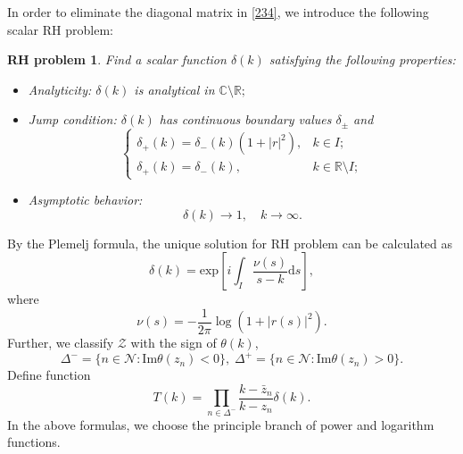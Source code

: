 \documentclass[11pt]{article}
\numberwithin{equation}{section}
\newtheorem{RHP}{RH problem}
\begin{document}
In order to eliminate the diagonal matrix in \eqref{234}, we introduce the following scalar RH problem:
\begin{RHP}\label{rhp2}
    Find a scalar function $\delta(k)$ satisfying the following properties:
\begin{itemize}
  \item Analyticity: $\delta(k)$ is analytical in $\mathbb{C}\setminus\mathbb{R};$
  \item Jump condition: $\delta(k)$ has continuous boundary values $\delta_{\pm}$ and
      \begin{equation*}
\left\{\begin{array}{ll}
\delta_+(k)=\delta_-(k)(1+|r|^2), &k\in I;\\
\delta_+(k)=\delta_-(k), &k\in\mathbb{R}\setminus I;\end{array}\right.
\end{equation*}
  \item Asymptotic behavior:
  \begin{equation*}
  \delta(k)\to 1,\quad k\to \infty.
  \end{equation*}
\end{itemize}
\end{RHP}
By the Plemelj formula, the unique solution for RH problem can be calculated as
\begin{equation*}
\delta(k)=\mathrm{exp}\left[i\int_I\frac{\nu(s)}{s-k}\mathrm{d}s\right],
\end{equation*}
where
\begin{equation*} \nu(s)=-\frac{1}{2\pi}\log(1+|r(s)|^2).
\end{equation*}
Further, we classify $\mathcal{Z}$ with the sign of $\theta(k)$,
\begin{equation}\label{eq43}
    \Delta^-=\{n\in\mathcal{N}:\mathrm{Im}\theta(z_n)<0\},\;\Delta^+=\{n\in\mathcal{N}:\mathrm{Im}\theta(z_n)>0\}.
\end{equation}
Define function
\begin{equation}
    T(k)=\prod\limits_{n\in\Delta^-}\frac{k-\bar{z}_n}{k-z_n}\delta(k).\label{T1}
\end{equation}
In the above formulas, we choose the principle branch of power and logarithm functions.
\end{document}

